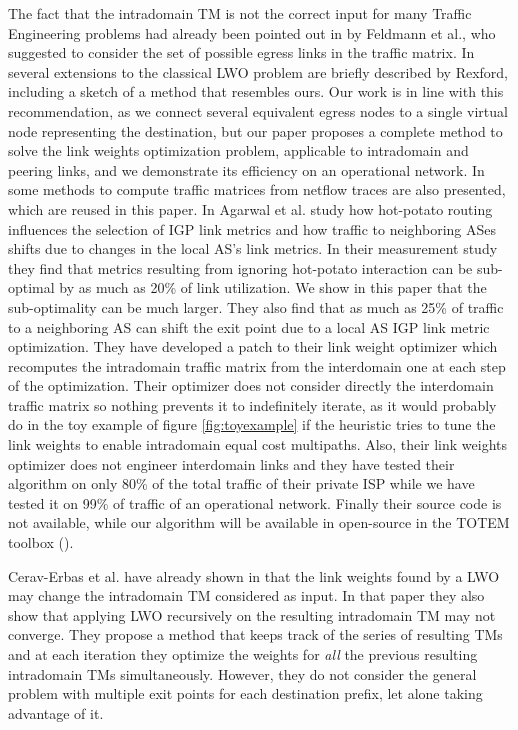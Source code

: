 \documentclass{acm_proc_article-sp}
\begin{document}
The fact that the intradomain TM is not the correct input for many Traffic Engineering
problems had already been pointed out in  \cite{feldmann,rexford2} by Feldmann et al., 
who suggested to consider the set of possible
egress links in the traffic matrix. 
In \cite{rexford1} several extensions to the classical LWO problem are briefly described by Rexford, 
including a sketch of a method that resembles ours. 
Our work is in line with this recommendation, 
as we connect several equivalent egress nodes to a single virtual node representing the destination,
but our paper proposes a complete method to solve the link weights optimization problem, 
applicable to intradomain and peering links, 
and we demonstrate its efficiency on an operational network.
In \cite{feldmann} some methods to compute traffic matrices from
netflow traces are also presented, which are reused in this paper.
In \cite{agarwal05} Agarwal et al. study how hot-potato routing
  influences the selection of IGP link metrics and how traffic to
  neighboring ASes shifts due to changes in the
  local AS's link metrics. In their measurement study they find that
  metrics resulting from ignoring hot-potato interaction can be
  sub-optimal by as much as 20\% of link utilization. We show in this
  paper that the sub-optimality can be much larger. They also find
  that as much as 25\% of traffic to a neighboring AS can shift the
  exit point due to a local AS IGP link metric optimization. They have
  developed a patch to their link weight optimizer which recomputes
  the intradomain traffic matrix from the interdomain one at each step
  of the optimization. Their optimizer does not consider directly the
  interdomain traffic matrix so nothing prevents it to indefinitely
  iterate, as it would probably do in the toy example of figure \ref{fig:toyexample} if the
  heuristic tries to tune the link weights to enable intradomain
  equal cost multipaths. Also, their link weights optimizer does not
  engineer interdomain links and they have tested their algorithm on
  only 80\% of the total traffic of their private ISP while we have tested it on 99\% of
  traffic of an operational network. 
  Finally their source code is not available, while our algorithm 
  will be available in open-source in the TOTEM toolbox (\cite{totem}).

Cerav-Erbas et al. have already shown in \cite{selin} that the link
weights found by a LWO may change the intradomain TM considered as
input. In that paper they also show that applying LWO recursively on the resulting intradomain TM may not converge.
They propose a method that keeps track of the series of resulting TMs 
and at each iteration they optimize the weights for \textit{all} the
previous resulting intradomain TMs simultaneously.
However, they do not consider the general problem with
multiple exit points for each destination prefix, let alone taking
advantage of it.
\end{document}
